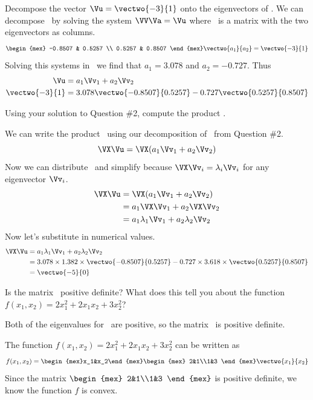 \documentclass[12pt,ragged]{pajarticle}
\begin{document}
\begin{question}{2}{%
Decompose the vector $\Vu = \vectwo{-3}{1}$ onto the eigenvectors of \VX.}{
We can decompose \Vu\ by solving the system $\VV\Va=\Vu$ where \VV\ is a matrix with the two eigenvectors as columns.
\[ \begin{mex} -0.8507 & 0.5257 \\ 0.5257 & 0.8507 \end{mex} \vectwo{a_1}{a_2} = \vectwo{-3}{1} \]
Solving this systems in \Matlab\ we find that $a_1=3.078$ and $a_2=-0.727$. Thus
\begin{align*}
	\Vu &= a_1\Vv_1 + a_2\Vv_2 \\
	\vectwo{-3}{1} &= 3.078	\vectwo{-0.8507}{0.5257} - 0.727\vectwo{0.5257}{0.8507}
\end{align*}
}
\end{question}

\begin{question}{3}{%
Using your solution to Question \#2, compute the product \VX\Vu.}{
We can write the product \VX\Vu\ using our decomposition of \Vu\ from Question \#2.
\[ \VX\Vu = \VX(a_1\Vv_1 + a_2\Vv_2) \]
Now we can distribute \VX\ and simplify because $\VX\Vv_i = \lambda_i\Vv_i$ for any eigenvector $\Vv_i$.
\begin{align*}
	\VX\Vu &= \VX(a_1\Vv_1 + a_2\Vv_2) \\
		&= a_1\VX\Vv_1 + a_2\VX\Vv_2 \\
		&= a_1\lambda_1\Vv_1 + a_2\lambda_2\Vv_2
\end{align*}
Now let's substitute in numerical values.
\begin{align*}
	\VX\Vu &= a_1\lambda_1\Vv_1 + a_2\lambda_2\Vv_2 \\
	 &= 3.078\times1.382\times\vectwo{-0.8507}{0.5257} - 0.727\times3.618\times\vectwo{0.5257}{0.8507} \\
	 &= \vectwo{-5}{0}
\end{align*}

}
\end{question}

\begin{question}{4}{%
Is the matrix \VX\ positive definite? What does this tell you about the function $f(x_1,x_2) = 2x_1^2 + 2x_1x_2 + 3x_2^2$?}{
Both of the eigenvalues for \VX\ are positive, so the matrix \VX\ is positive definite.

The function $f(x_1,x_2) = 2x_1^2 + 2x_1x_2 + 3x_2^2$ can be written as
\[ f(x_1,x_2) = \begin{mex}x_1&x_2\end{mex}\begin{mex} 2&1\\1&3 \end{mex}\vectwo{x_1}{x_2} \]
Since the matrix $\begin{mex} 2&1\\1&3 \end{mex}$ is positive definite, we know the function $f$ is convex.
}
\end{question}
\end{document}
